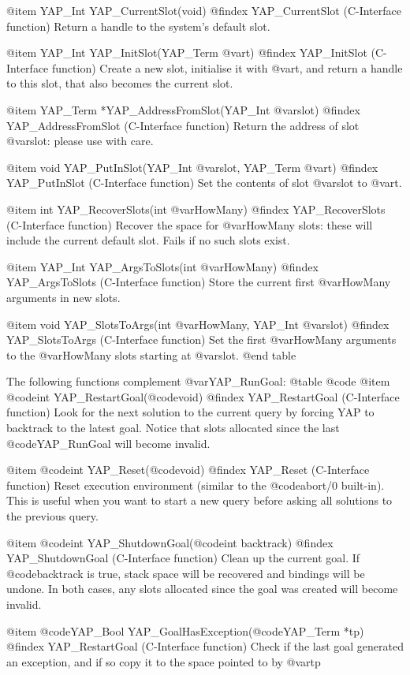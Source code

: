{{{{{{{{{@item YAP_Int YAP_CurrentSlot(void)
@findex YAP_CurrentSlot (C-Interface function)
Return a handle to the system's default slot.

@item YAP_Int YAP_InitSlot(YAP_Term @var{t})
@findex YAP_InitSlot (C-Interface function)
Create a new slot, initialise it with @var{t}, and return a handle to
this slot, that also becomes the current slot.

@item YAP_Term *YAP_AddressFromSlot(YAP_Int @var{slot})
@findex YAP_AddressFromSlot (C-Interface function)
Return the address of slot @var{slot}: please use with care.

@item void YAP_PutInSlot(YAP_Int @var{slot}, YAP_Term @var{t})
@findex YAP_PutInSlot (C-Interface function)
Set the contents of slot @var{slot} to @var{t}.

@item int YAP_RecoverSlots(int @var{HowMany})
@findex YAP_RecoverSlots (C-Interface function)
Recover the space for @var{HowMany} slots: these will include the
current default slot. Fails if no such slots exist.

@item YAP_Int YAP_ArgsToSlots(int @var{HowMany})
@findex YAP_ArgsToSlots (C-Interface function)
Store the current first  @var{HowMany} arguments in new slots.

@item void YAP_SlotsToArgs(int @var{HowMany}, YAP_Int @var{slot})
@findex YAP_SlotsToArgs (C-Interface function)
Set the first @var{HowMany} arguments to the @var{HowMany} slots
starting at @var{slot}.
@end table

The following functions complement @var{YAP_RunGoal}:
@table @code
@item  @code{int} YAP_RestartGoal(@code{void})
@findex YAP_RestartGoal (C-Interface function)
Look for the next solution to the current query by forcing YAP to
backtrack to the latest goal. Notice that slots allocated since the last
@code{YAP_RunGoal} will become invalid.

@item  @code{int} YAP_Reset(@code{void})
@findex YAP_Reset (C-Interface function)
Reset execution environment (similar to the @code{abort/0}
built-in). This is useful when you want to start a new query before
asking all solutions to the previous query.

@item  @code{int} YAP_ShutdownGoal(@code{int backtrack})
@findex YAP_ShutdownGoal (C-Interface function)
Clean up the current goal. If
@code{backtrack} is true, stack space will be recovered and bindings
will be undone. In both cases, any slots allocated since the goal was
created will become invalid.

@item  @code{YAP_Bool} YAP_GoalHasException(@code{YAP_Term *tp})
@findex YAP_RestartGoal (C-Interface function)
Check if the last goal generated an exception, and if so copy it to the
space pointed to by @var{tp}

}}}}}}}}}
